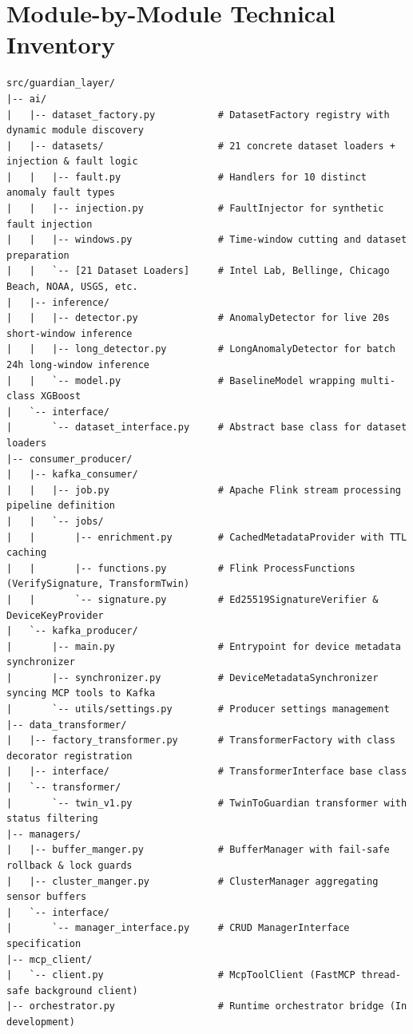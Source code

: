 \documentclass[10pt,a4paper]{report}
\begin{document}
\section{Module-by-Module Technical Inventory}
\begin{lstlisting}
src/guardian_layer/
|-- ai/
|   |-- dataset_factory.py           # DatasetFactory registry with dynamic module discovery
|   |-- datasets/                    # 21 concrete dataset loaders + injection & fault logic
|   |   |-- fault.py                 # Handlers for 10 distinct anomaly fault types
|   |   |-- injection.py             # FaultInjector for synthetic fault injection
|   |   |-- windows.py               # Time-window cutting and dataset preparation
|   |   `-- [21 Dataset Loaders]     # Intel Lab, Bellinge, Chicago Beach, NOAA, USGS, etc.
|   |-- inference/
|   |   |-- detector.py              # AnomalyDetector for live 20s short-window inference
|   |   |-- long_detector.py         # LongAnomalyDetector for batch 24h long-window inference
|   |   `-- model.py                 # BaselineModel wrapping multi-class XGBoost
|   `-- interface/
|       `-- dataset_interface.py     # Abstract base class for dataset loaders
|-- consumer_producer/
|   |-- kafka_consumer/
|   |   |-- job.py                   # Apache Flink stream processing pipeline definition
|   |   `-- jobs/
|   |       |-- enrichment.py        # CachedMetadataProvider with TTL caching
|   |       |-- functions.py         # Flink ProcessFunctions (VerifySignature, TransformTwin)
|   |       `-- signature.py         # Ed25519SignatureVerifier & DeviceKeyProvider
|   `-- kafka_producer/
|       |-- main.py                  # Entrypoint for device metadata synchronizer
|       |-- synchronizer.py          # DeviceMetadataSynchronizer syncing MCP tools to Kafka
|       `-- utils/settings.py        # Producer settings management
|-- data_transformer/
|   |-- factory_transformer.py       # TransformerFactory with class decorator registration
|   |-- interface/                   # TransformerInterface base class
|   `-- transformer/
|       `-- twin_v1.py               # TwinToGuardian transformer with status filtering
|-- managers/
|   |-- buffer_manger.py             # BufferManager with fail-safe rollback & lock guards
|   |-- cluster_manger.py            # ClusterManager aggregating sensor buffers
|   `-- interface/
|       `-- manager_interface.py     # CRUD ManagerInterface specification
|-- mcp_client/
|   `-- client.py                    # McpToolClient (FastMCP thread-safe background client)
|-- orchestrator.py                  # Runtime orchestrator bridge (In development)

\end{lstlisting}
\end{document}
